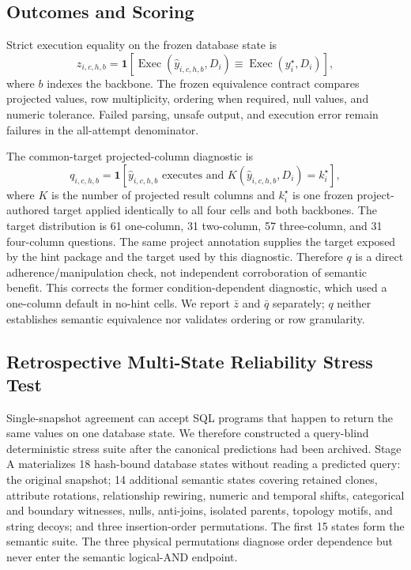 \documentclass[applsci,article,submit,moreauthors]{Definitions/mdpi}
\begin{document}
\subsection{Outcomes and Scoring}
Strict execution equality on the frozen database state is
\begin{equation}
z_{i,c,h,b}=\mathbf{1}\!\left[\operatorname{Exec}(\widehat y_{i,c,h,b},D_i)
\equiv \operatorname{Exec}(y_i^\star,D_i)\right],
\end{equation}
where $b$ indexes the backbone. The frozen equivalence contract compares projected values, row multiplicity, ordering when required, null values, and numeric tolerance. Failed parsing, unsafe output, and execution error remain failures in the all-attempt denominator.

The common-target projected-column diagnostic is
\begin{equation}
q_{i,c,h,b}=\mathbf{1}[\widehat y_{i,c,h,b}\text{ executes and }K(\widehat y_{i,c,h,b},D_i)=k_i^\star],
\end{equation}
where $K$ is the number of projected result columns and $k_i^\star$ is one frozen project-authored target applied identically to all four cells and both backbones. The target distribution is 61 one-column, 31 two-column, 57 three-column, and 31 four-column questions. The same project annotation supplies the target exposed by the hint package and the target used by this diagnostic. Therefore $q$ is a direct adherence/manipulation check, not independent corroboration of semantic benefit. This corrects the former condition-dependent diagnostic, which used a one-column default in no-hint cells. We report $\bar z$ and $\bar q$ separately; $q$ neither establishes semantic equivalence nor validates ordering or row granularity.

\subsection{Retrospective Multi-State Reliability Stress Test}
Single-snapshot agreement can accept SQL programs that happen to return the same values on one database state. We therefore constructed a query-blind deterministic stress suite after the canonical predictions had been archived. Stage A materializes 18 hash-bound database states without reading a predicted query: the original snapshot; 14 additional semantic states covering retained clones, attribute rotations, relationship rewiring, numeric and temporal shifts, categorical and boundary witnesses, nulls, anti-joins, isolated parents, topology motifs, and string decoys; and three insertion-order permutations. The first 15 states form the semantic suite. The three physical permutations diagnose order dependence but never enter the semantic logical-AND endpoint.
\end{document}
